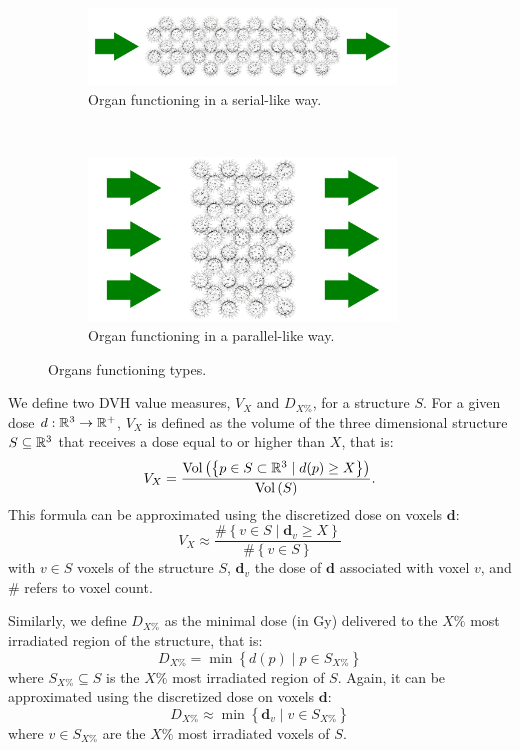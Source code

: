 \begin{figure}
	\begin{subfigure}{0.6\textwidth}
		\centering
		\includegraphics[width=0.9\textwidth]{serial_organ.pdf}
		\vspace{4mm}
		\caption{Organ functioning in a serial-like way.}
		\label{fig:serial_organ}
	\end{subfigure}
	\hfill
	\unskip\ \vrule\
	\hfill
	\begin{subfigure}{0.38\textwidth}
		\centering
		\includegraphics[width=0.9\textwidth]{parallel_organ.pdf}
		\caption{Organ functioning in a parallel-like way.}
		\label{fig:parallel_organ}
	\end{subfigure}
	\caption{Organs functioning types.}
	\label{fig:serial_parallel_organ}	
\end{figure}

We define two DVH value measures, $V_X$ and $D_{X\%}$, for a structure $S$.
For a given dose $d: \mathbb{R}^3 \to \mathbb{R}^+$, $V_X$ is defined as the volume of the three dimensional structure $S \subseteq \mathbb{R}^3$ that receives a dose equal to or higher than $X$, that is:
$$ V_X = \frac{\text{Vol} \left( {\left\lbrace p \in S \subset \mathbb{R}^3 \mid d(p) \geq X \right\rbrace} \right)}{\text{Vol} \left( {S} \right)}.$$
This formula can be approximated using the discretized dose on voxels $\mathbf{d}$:
$$ V_X \approx \frac{ \#{\left\lbrace v \in S \mid \mathbf{d}_v \geq X \right\rbrace}}{\#\left\{ v \in S \right\}}$$
with $v \in S$ voxels of the structure $S$, $\mathbf{d}_v$ the dose of $\mathbf{d}$ associated with voxel $v$, and $\#$ refers to voxel count.

Similarly, we define $D_{X\%}$ as the minimal dose (in Gy) delivered to the $X\%$ most irradiated region of the structure, that is:
$$D_{X\%} = \min \left\lbrace d(p) \mid p \in S_{X\%} \right\rbrace$$
where $S_{X\%} \subseteq S$ is the $X\%$ most irradiated region of $S$.
Again, it can be approximated using the discretized dose on voxels $\mathbf{d}$:
$$D_{X\%} \approx \min \left\lbrace \mathbf{d}_v \mid v \in S_{X\%} \right\rbrace$$
where $v \in S_{X\%}$ are the $X\%$ most irradiated voxels of $S$.

